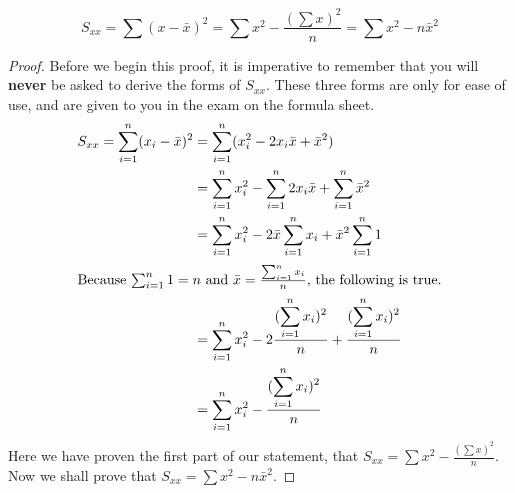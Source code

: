 \begin{tcolorbox}[breakable]
    \begin{claim}
        $$S_{xx} = \sum (x - \bar{x})^2 = \sum x^2 - \frac{(\sum x)^2}{n} = \sum x^2 - n\bar{x}^2$$
    \end{claim}
\end{tcolorbox} 
\begin{tcolorbox}[breakable]
    \begin{proof}
    Before we begin this proof, it is imperative to remember that you will \textbf{never} be asked to derive the forms of $S_{xx}$. These three forms are only for ease of use, and are given to you in the exam on the formula sheet.
        \begin{align*}
            S_{xx} = \sum_{i=1}^n (x_i-\bar{x})^2 &= \sum_{i=1}^n (x_i^2 - 2x_i\bar{x} + \bar{x}^2) \\
            &= \sum_{i=1}^n x_i^2 - \sum_{i=1}^n 2x_i\bar{x} + \sum_{i=1}^n \bar{x}^2 \\
            &= \sum_{i=1}^n x_i^2 - 2\bar{x}\sum_{i=1}^n x_i + \bar{x}^2 \sum_{i=1}^n 1 \\
           \intertext{Because $\sum_{i=1}^n 1 = n$ and $\bar{x} = \frac{\sum_{i=1}^n x_i}{n}$, the following is true.}
            &= \sum_{i=1}^n x_i^2 - 2\frac{(\displaystyle \sum_{i=1}^n x_i)^2}{n} + \frac{(\displaystyle \sum_{i=1}^n x_i)^2}{n}\\
            &= \sum_{i=1}^n x_i^2 - \frac{(\displaystyle \sum_{i=1}^n x_i)^2}{n}
        \end{align*}
        Here we have proven the first part of our statement, that $S_{xx}=\sum x^2 - \frac{(\sum x)^2}{n}$. Now we shall prove that $S_{xx} = \sum x^2 - n\bar{x}^2$.


\end{proof}
\end{tcolorbox}

